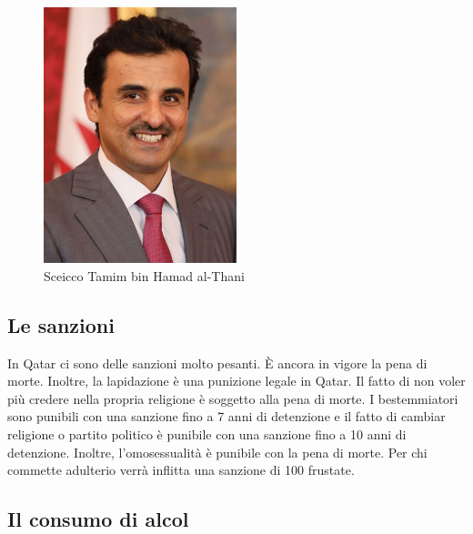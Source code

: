 \documentclass[a4paper, 12pt]{article}
\begin{document}
\begin{figure}[h]
    \centering
    \includegraphics[width=0.5\textwidth]{images/sheikh.png}
    \caption{Sceicco Tamim bin Hamad al-Thani}
\end{figure}



\subsection{Le sanzioni}

In Qatar ci sono delle sanzioni molto pesanti. È ancora in vigore la pena di morte. Inoltre, la lapidazione è una punizione legale in Qatar. Il fatto di non voler più credere nella propria religione è soggetto alla pena di morte. I bestemmiatori sono punibili con una sanzione fino a 7 anni di detenzione e il fatto di cambiar religione o partito politico è punibile con una sanzione fino a 10 anni di detenzione. Inoltre, l'omosessualità è punibile con la pena di morte. Per chi commette adulterio verrà inflitta una sanzione di 100 frustate.

\pagebreak

\subsection{Il consumo di alcol}
\end{document}
